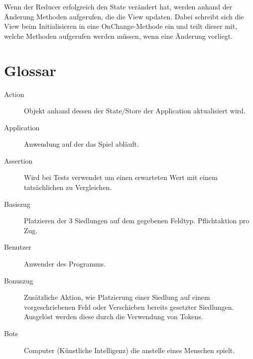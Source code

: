 \documentclass[a4paper]{scrreprt}
\begin{document}
Wenn der Reducer erfolgreich den State verändert hat, werden anhand der Änderung Methoden aufgerufen, die die View updaten. Dabei schreibt sich die View beim Initialisieren in eine OnChange-Methode ein und teilt dieser mit, welche Methoden aufgerufen werden müssen, wenn eine Änderung vorliegt.


\section{Glossar}
\begin{description}
	\item[Action] Objekt anhand dessen der State/Store der Application aktualisiert wird.
	\item[Application] Anwendung auf der das Spiel abläuft.
	\item[Assertion] Wird bei Tests verwendet um einen erwarteten Wert mit einem tatsächlichen zu Vergleichen.
	\item[Basiszug] Platzieren der 3 Siedlungen auf dem gegebenen Feldtyp. Pflichtaktion pro Zug.
	\item[Benutzer] Anwender des Programms.
	\item[Bonuszug] Zusätzliche Aktion, wie Platzierung einer Siedlung auf einem vorgeschriebenen Feld oder Verschieben bereits gesetzter Siedlungen.
			     Ausgelöst werden diese durch die Verwendung von Tokens.
	\item[Bots]	     Computer (Künstliche Intelligenz) die anstelle eines Menschen spielt.
\end{description}
\end{document}
